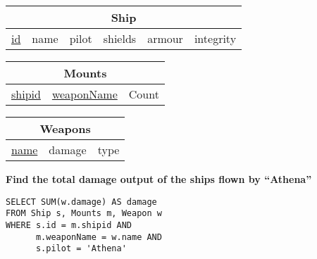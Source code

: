 \documentclass{beamer}
\begin{document}
\begin{frame}[fragile]

\begin{tabular}{|c|c|c|c|c|c|}
\hline
\multicolumn{6}{|c|}{\textbf{Ship}} \\
\hline
\underline{id} & name & pilot & shields & armour & integrity \\
\hline
\end{tabular}

\begin{tabular}{|c|c|c|}
\hline
\multicolumn{3}{|c|}{\textbf{Mounts}} \\
\hline
\underline{shipid} & \underline{weaponName} & Count \\
\hline
\end{tabular}

\begin{tabular}{|c|c|c|}
\hline
\multicolumn{3}{|c|}{\textbf{Weapons}} \\
\hline
\underline{name} & damage & type \\
\hline
\end{tabular}

\vspace{0.25cm}
\textbf{Find the total damage output of the ships flown by ``Athena''}

\pause
\begin{lstlisting}[showstringspaces=false]
SELECT SUM(w.damage) AS damage
FROM Ship s, Mounts m, Weapon w
WHERE s.id = m.shipid AND 
      m.weaponName = w.name AND
      s.pilot = 'Athena'
\end{lstlisting}

\end{frame}
\end{document}
